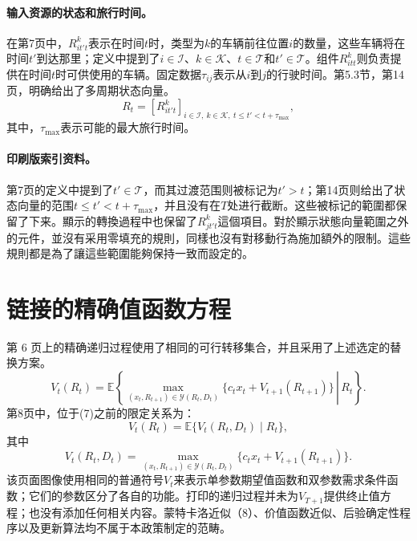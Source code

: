 \documentclass{article}
\begin{document}
\paragraph{输入资源的状态和旅行时间。}
在第7页中，\(R_{it't}^{k}\)表示在时间\(t\)时，类型为\(k\)的车辆前往位置\(i\)的数量，这些车辆将在时间\(t'\)到达那里；定义中提到了\(i\in\mathcal{I}\)、\(k\in\mathcal{K}\)、\(t\in\mathcal{T}\)和\(t'\in\mathcal{T}\)。组件\(R_{itt}^{k}\)则负责提供在时间\(t\)时可供使用的车辆。固定数据\(\tau_{ij}\)表示从\(i\)到\(j\)的行驶时间。第5.3节，第14页，明确给出了多周期状态向量。
\[
R_t=[R_{it't}^{k}]_{i\in\mathcal{I},\ k\in\mathcal{K},\ t\leq t'<t+\tau_{\max}},
\]
其中，\(\tau_{\max}\)表示可能的最大旅行时间。

\paragraph{印刷版索引资料。}
第7页的定义中提到了\(t'\in\mathcal{T}\)，而其过渡范围则被标记为\(t'>t\)；第14页则给出了状态向量的范围\(t\leq t'<t+\tau_{\max}\)，并且没有在\(T\)处进行截断。这些被标记的範圍都保留了下来。顯示的轉換過程中也保留了\(R_{jt't}^{k}\)這個項目。對於顯示狀態向量範圍之外的元件，並沒有采用零填充的規則，同樣也沒有對移動行為施加額外的限制。這些規則都是為了讓這些範圍能夠保持一致而設定的。

\section*{链接的精确值函数方程}
第 6 页上的精确递归过程使用了相同的可行转移集合，并且采用了上述选定的替换方案。
\begin{equation}
V_t(R_t)=\mathbb{E}\left\{\left.
\max_{(x_t,R_{t+1})\in\mathcal{Y}(R_t,D_t)}
\bigl\{c_tx_t+V_{t+1}(R_{t+1})\bigr\}
\,\right|\,R_t\right\}.
\tag{6}
\end{equation}
第8页中，位于(7)之前的限定关系为：
\[
V_t(R_t)=\mathbb{E}\{V_t(R_t,D_t)\mid R_t\},
\]
其中
\begin{equation}
V_t(R_t,D_t)=
\max_{(x_t,R_{t+1})\in\mathcal{Y}(R_t,D_t)}
\bigl\{c_tx_t+V_{t+1}(R_{t+1})\bigr\}.
\tag{7}
\end{equation}
该页面图像使用相同的普通符号\(V_t\)来表示单参数期望值函数和双参数需求条件函数；它们的参数区分了各自的功能。打印的递归过程并未为\(V_{T+1}\)提供终止值方程；也没有添加任何相关内容。蒙特卡洛近似（8）、价值函数近似、后验确定性程序以及更新算法均不属于本政策制定的范畴。
\end{document}
